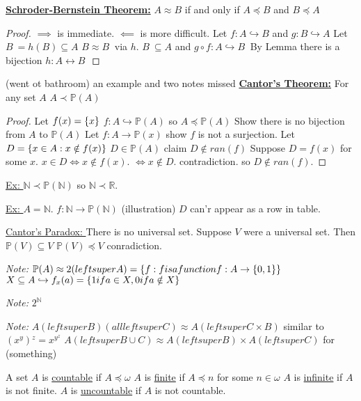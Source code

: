 \underline{\textbf{Schroder-Bernstein Theorem:}} $A \approx B$ if and only if $A \preceq B$ and $B \preceq A$
\begin{proof}
    $\implies$ is immediate.
    $\impliedby$ is more difficult.
    Let $f : A \hookrightarrow B$ and $g : B \hookrightarrow A$
    Let $B^{~} = h(B) \subseteq A$
    $B \approx B^{~}$ via $h$.
    $B^{~} \subseteq A$ and $g \circ f : A \hookrightarrow B^{~}$
    By Lemma there is a bijection $h : A \leftrightarrow B^{~}$
    \end{proof}
    (went ot bathroom)
    an example and two notes missed
\textbf{\underline{Cantor's Theorem:}} For any set $A$ $A \prec \mathbb{P}(A)$
\begin{proof}
    Let $f(x) = \{x\}$ $f : A \hookrightarrow \mathbb{P}(A)$ so $A \preceq \mathbb{P}(A)$
    Show there is no bijection from $A$ to $\mathbb{P}(A)$
    Let $f : A \rightarrow \mathbb{P}(x)$
    show $f$ is not a surjection.
    Let $D = \{x \in A : x \notin f(x)\}$
    $D \in \mathbb{P}(A)$
    claim $D \notin ran(f)$
    Suppose $D = f(x)$ for some $x$.
    $x \in D \iff x \notin f(x)$.
    $\iff x \notin D$.
    contradiction.
    so $D \notin ran(f)$.
    \end{proof}

\underline{Ex: } $\mathbb{N} \prec \mathbb{P}(\mathbb{N})$ so $\mathbb{N} \prec \mathbb{R}$.

\underline{Ex: } $ A = \mathbb{N}$.
$f : \mathbb{N} \rightarrow \mathbb{P}(\mathbb{N})$
(illustration)
$D$ can'r appear as a row in table.

\underline{Cantor's Paradox: } There is no universal set.
Suppose $V$ were a universal set.
Then $\mathbb{P}(V) \subseteq V$
$\mathbb{P}(V) \preceq V$
conradiction.

\emph{Note: } $\mathbb{P}(A) \approx 2 (left super A) = \{f : f is a function f: A \rightarrow \{0,1\}\}$
$X \subseteq A \hookrightarrow f_x(a) = \{1 if a \in X, 0 if a \notin X\}$

\emph{Note: } $2^{\mathbb{N}}$

\emph{Note: } $A (left super B) (all left super C) \approx A (left super C \times B)$ similar to $(x^y){^z} = x^{y^z}$
$A (left super B \cup C) \approx A (left super B) \times A (left super C)$ for (something)

 A set $A$ is \underline{countable} if $A \preceq \omega$
$A$ is \underline{finite} if $A \preceq n$ for some $n \in \omega$
$A$ is \underline{infinite} if $A$ is not finite.
$A$ is \underline{uncountable} if $A$ is not countable.

